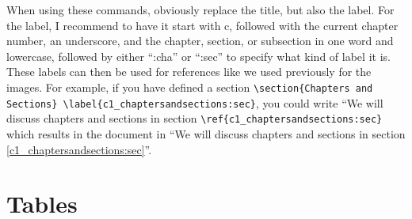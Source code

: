 When using these commands, obviously replace the title, but also the label. For the label, I recommend to have it start with c, followed with the current chapter number, an underscore, and the chapter, section, or subsection in one word and lowercase, followed by either ``:cha'' or ``:sec'' to specify what kind of label it is. These labels can then be used for references like we used previously for the images. For example, if you have defined a section \lstinline[language=Tex]!\section{Chapters and Sections} \label{c1_chaptersandsections:sec}!, you could write ``We will discuss chapters and sections in section \lstinline[language=Tex]!\ref{c1_chaptersandsections:sec}! which results in the document in ``We will discuss chapters and sections in section \ref{c1_chaptersandsections:sec}''.


\section{Tables}\label{c1_tables:sec}

